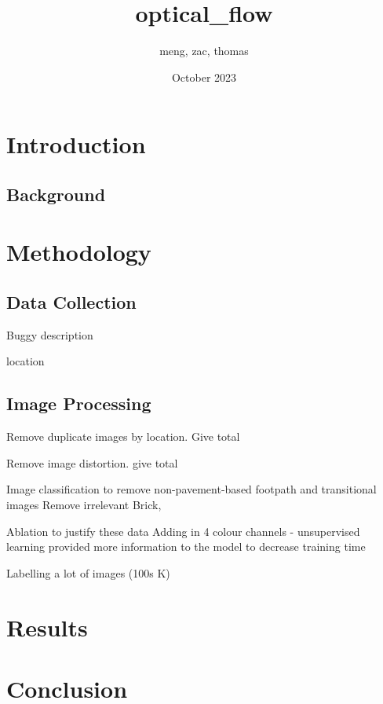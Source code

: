 \documentclass{article}
\title{optical_flow}
\author{meng, zac, thomas}
\date{October 2023}
\begin{document}
\maketitle

\section{Introduction}

\subsection{Background}


\section{Methodology}

\subsection{Data Collection}

Buggy description

location


\subsection{Image Processing}

Remove duplicate images by location. Give total


Remove image distortion. give total


Image classification to remove non-pavement-based footpath and transitional images
Remove irrelevant 
Brick, 


Ablation to justify these data
Adding in 4 colour channels - unsupervised learning provided more information to the model to decrease training time

Labelling a lot of images (100s K)


\subsection{}


\section{Results}


\section{Conclusion}
\end{document}
